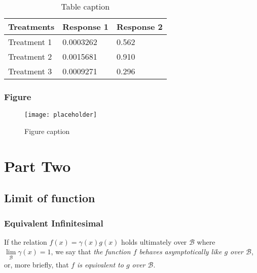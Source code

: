 \documentclass[12pt,fleqn]{book} %
\begin{document}
\begin{table}[h]
\centering
\begin{tabular}{l l l}
\toprule
\textbf{Treatments} & \textbf{Response 1} & \textbf{Response 2}\\
\midrule
Treatment 1 & 0.0003262 & 0.562 \\
Treatment 2 & 0.0015681 & 0.910 \\
Treatment 3 & 0.0009271 & 0.296 \\
\bottomrule
\end{tabular}
\caption{Table caption}
\end{table}


\section{Figure}

\begin{figure}[h]
\centering\texttt{[image: placeholder]}
\caption{Figure caption}
\end{figure}





\part{Part Two}






\chapter{Limit of function}

\section{Equivalent Infinitesimal}

\begin{definition}
If the relation $f(x)=\gamma(x)g(x)$ holds ultimately over $\mathcal{B}$ where $\lim\limits_{\mathcal{B}}{\gamma(x)}=1$, we say that \emph{the function $f$ behaves asymptotically like $g$ over $\mathcal{B}$}, or, more briefly, that $f$ \emph{is equivalent to $g$ over $\mathcal{B}$}.



\end{definition}
\end{document}
